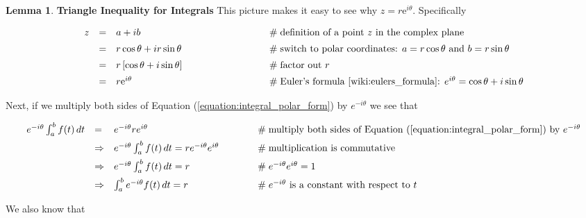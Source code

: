 \documentclass{article}
\theoremstyle{definition}
\newtheorem{lemma}{Lemma}[section]
\begin{document}
\begin{lemma} {\bf Triangle Inequality for Integrals}
\bigskip
\noindent
This picture makes it easy to see why $z = r \mathrm{e}^{i
\theta}$. Specifically

\begin{equation*}
\begin{array}{lllll}
z
&=& a + ib
                &\qquad \qquad \qquad \qquad \mathrel{\#}
					\text{definition of a point $z$ in the complex plane} \\ 
[5pt]
&=&  r \cos \theta + i r \sin \theta
                &\qquad \qquad \qquad \qquad \mathrel{\#}
					\text{switch to polar coordinates: $a = r \cos
					\theta$ and $b = r \sin \theta$} \\ 
[5pt]
&=&  r \left [ \cos \theta +i \sin \theta \right ]
                &\qquad \qquad \qquad \qquad \mathrel{\#}
					\text{factor out  $r$} \\ 
[5pt]
&=& r \mathrm{e}^{i\theta}
                &\qquad \qquad \qquad \qquad \mathrel{\#}
					\text{Euler's formula \cite{wiki:eulers_formula}: }  
					e^{i\theta} = \cos \theta + i \sin \theta
\end{array}
\end{equation*}

\bigskip
\noindent
Next, if we multiply both sides of Equation (\ref{equation:integral_polar_form})
by $e^{-i\theta}$ we see that  

\begin{equation*}
\begin{array}{llll}
e^{-i\theta} \int_{a}^{b} f(t) \, dt 
&=& e^{-i\theta} re^{i\theta}			
	&\hspace{3em} \mathrel{\#} \text{multiply both sides of Equation (\ref{equation:integral_polar_form})
by $e^{-i\theta}$} \\
[5pt]
&\Rightarrow& e^{-i\theta} \int_{a}^{b} f(t) \, dt  = r e^{-i\theta} e^{i\theta}			
	&\hspace{3em} \mathrel{\#} \text{multiplication is commutative} \\
[5pt]
&\Rightarrow& e^{-i\theta} \int_{a}^{b} f(t) \, dt  = r
	&\hspace{3em} \mathrel{\#}  e^{-i\theta} e^{i\theta} = 1\\
[5pt]
&\Rightarrow& \int_{a}^{b} e^{-i\theta} f(t) \, dt  = r
	&\hspace{3em} \mathrel{\#} \text{$e^{-i\theta}$ is a constant with respect to $t$}
\end{array}
\end{equation*}

\bigskip
\noindent
We also know that 


\end{lemma}
\end{document}

